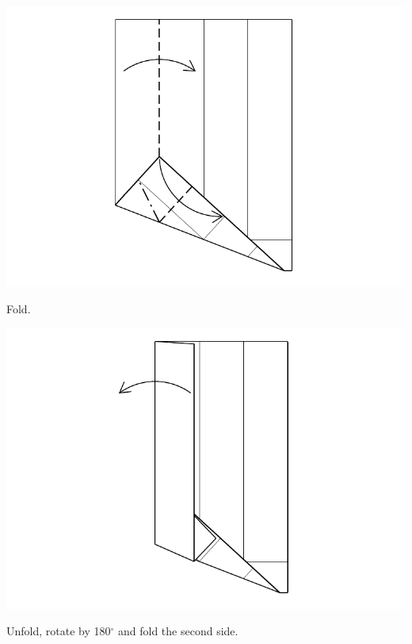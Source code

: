 \documentclass[11pt]{article}
\begin{document}
\vspace*{0.5in}

\begin{minipage}[t]{0.45\textwidth}
  \includegraphics[width=\textwidth]{../figs/fig08-06}
  \begin{itemize}{\item[6.] Fold.}\end{itemize}
\end{minipage}
\hfill
\begin{minipage}[t]{0.45\textwidth}
  \includegraphics[width=\textwidth]{../figs/fig08-07}
  \begin{itemize}{\item[7.] Unfold, rotate by 180$^\circ$ and fold the second side.}\end{itemize}
\end{minipage}
\end{document}
